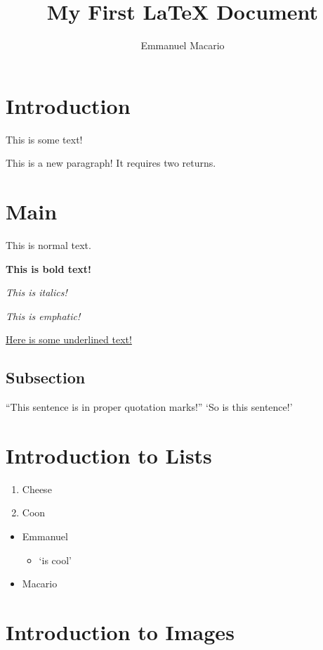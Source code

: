 \documentclass[12pt]{article}
\author{Emmanuel Macario}
\title{My First {\LaTeX} Document}
\begin{document}
\maketitle

\section{Introduction}

This is some text!

This is a new paragraph! It requires two returns.

\section{Main}
This is normal text.

\textbf{This is bold text!}

\textit{This is italics!}

\emph{This is emphatic!}

\underline{Here is some underlined text!}

\subsection{Subsection}
``This sentence is in proper quotation marks!''
`So is this sentence!'

\section{Introduction to Lists}
\begin{enumerate}
    \item Cheese
    \item Coon
\end{enumerate}

\begin{itemize}
    \item Emmanuel
    \begin{itemize}
        \item `is cool'
    \end{itemize}
    \item Macario
\end{itemize}

\section{Introduction to Images}
\end{document}
